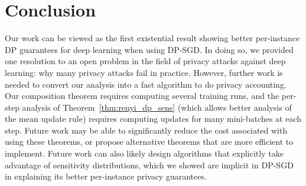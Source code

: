 \section{Conclusion}

Our work can be viewed as the first existential result showing better per-instance DP guarantees for deep learning when using DP-SGD. In doing so, we provided one resolution to an open problem in the field of privacy attacks against deep learning: why many privacy attacks fail in practice. However, further work is needed to convert our analysis into a fast algorithm to do privacy accounting. Our composition theorem requires computing several training runs, and the per-step analysis of Theorem~\ref{thm:renyi_dp_sens} (which allows better analysis of the mean update rule) requires computing updates for many mini-batches at each step. Future work may be able to significantly reduce the cost associated with using these theorems, or propose alternative theorems that are more efficient to implement. Future work can also likely design algorithms that explicitly take advantage of sensitivity distributions, which we showed are implicit in DP-SGD in explaining its better per-instance privacy guarantees.



